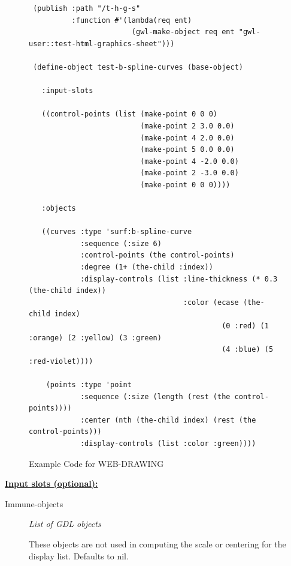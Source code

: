 \documentclass [11pt]{book}
\begin{document}
\begin{itemize}
\begin{figure}
\begin{lrbox}{\boxedverb}
\begin{minipage}{\linewidth}
{\begin{verbatim}
 (publish :path "/t-h-g-s"
          :function #'(lambda(req ent)
                        (gwl-make-object req ent "gwl-user::test-html-graphics-sheet")))

 (define-object test-b-spline-curves (base-object)

   :input-slots

   ((control-points (list (make-point 0 0 0)
                          (make-point 2 3.0 0.0) 
                          (make-point 4 2.0 0.0) 
                          (make-point 5 0.0 0.0) 
                          (make-point 4 -2.0 0.0) 
                          (make-point 2 -3.0 0.0) 
                          (make-point 0 0 0))))
  
   :objects

   ((curves :type 'surf:b-spline-curve
            :sequence (:size 6)
            :control-points (the control-points)
            :degree (1+ (the-child :index))
            :display-controls (list :line-thickness (* 0.3 (the-child index))
                                    :color (ecase (the-child index)
                                             (0 :red) (1 :orange) (2 :yellow) (3 :green)
                                             (4 :blue) (5 :red-violet))))

    (points :type 'point 
            :sequence (:size (length (rest (the control-points))))
            :center (nth (the-child index) (rest (the control-points)))
            :display-controls (list :color :green))))

\end{verbatim}}
\end{minipage}
\end{lrbox}
\fbox{\usebox{\boxedverb}}

\caption{Example Code for WEB-DRAWING}

\label{fig:example-code-WEB-DRAWING}

\end{figure}





\textbf{
\underline{Input slots (optional):}}

\begin{description}

\item [Immune-objects]
\emph{List of GDL objects}

 These objects are not used in computing the scale or centering for the display list. Defaults to nil.





\end{description}
\end{itemize}
\end{document}
